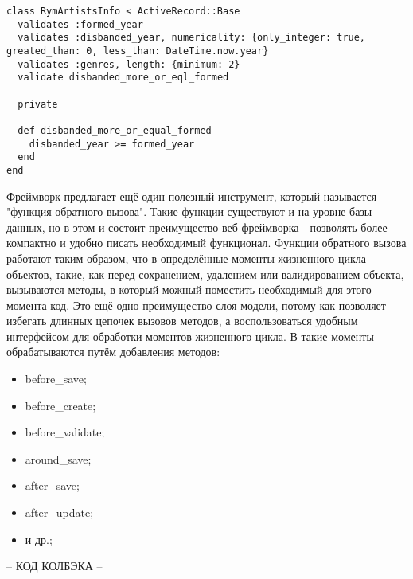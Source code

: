 \begin{lstlisting}[style=fsharpstyle,caption={Реализация валидации в классе RymArtistsInfo}, label=lst:arch_and_mod:mvc:model:rym_artists_info_validations]
class RymArtistsInfo < ActiveRecord::Base
  validates :formed_year
  validates :disbanded_year, numericality: {only_integer: true, greated_than: 0, less_than: DateTime.now.year}
  validates :genres, length: {minimum: 2}
  validate disbanded_more_or_eql_formed

  private

  def disbanded_more_or_equal_formed
    disbanded_year >= formed_year
  end
end
\end{lstlisting}

Фреймворк \ror{} предлагает ещё один полезный инструмент, который называется "функция обратного вызова". Такие функции существуют и на уровне базы данных, но в этом и состоит преимущество веб-фреймворка - позволять более компактно и удобно писать необходимый функционал. Функции обратного вызова работают таким образом, что в определённые моменты жизненного цикла объектов, такие, как перед сохранением, удалением или валидированием объекта, вызываются методы, в который можный поместить необходимый для этого момента код. Это ещё одно преимущество слоя модели, потому как позволяет избегать длинных цепочек вызовов методов, а воспользоваться удобным интерфейсом для обработки моментов жизненного цикла. В \ror{} такие моменты обрабатываются путём добавления методов:
\begin{itemize}
  \item before\_save;
  \item before\_create;
  \item before\_validate;
  \item around\_save;
  \item after\_save;
  \item after\_update;
  \item и др.;
\end{itemize}

-- КОД КОЛБЭКА --



